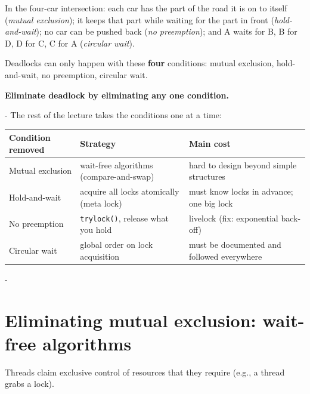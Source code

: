 \documentclass[11pt,a4paper]{article}
\makeatletter
\newcommand{\keepspace}[1]{\par\penalty-100\begingroup
  \setlength{\dimen@}{#1}\dimen@ii\pagegoal\advance\dimen@ii-\pagetotal
  \ifdim\dimen@>\dimen@ii\ifdim\dimen@ii>\z@\vfil\fi\break\fi\endgroup}
\makeatother
\begin{document}
In the four-car intersection: each car has the part of the road it is on to
itself (\emph{mutual exclusion}); it keeps that part while waiting for the
part in front (\emph{hold-and-wait}); no car can be pushed back
(\emph{no preemption}); and A waits for B, B for D, D for C, C for A
(\emph{circular wait}).

\begin{keybox}
Deadlocks can only happen with these \textbf{four} conditions: mutual
exclusion, hold-and-wait, no preemption, circular wait.

\textbf{Eliminate deadlock by eliminating any one condition.}
\end{keybox}

\keepspace{10\baselineskip}
The rest of the lecture takes the conditions one at a time:

\begin{center}
\renewcommand{\arraystretch}{1.2}
\begin{tabularx}{\textwidth}{@{}llX@{}}
  \toprule
  \textbf{Condition removed} & \textbf{Strategy} & \textbf{Main cost} \\
  \midrule
  Mutual exclusion & wait-free algorithms (compare-and-swap) & hard to design beyond simple structures \\
  Hold-and-wait & acquire all locks atomically (meta lock) & must know locks in advance; one big lock \\
  No preemption & \texttt{trylock()}, release what you hold & livelock (fix: exponential back-off) \\
  Circular wait & global order on lock acquisition & must be documented and followed everywhere \\
  \bottomrule
\end{tabularx}
\end{center}

\keepspace{12\baselineskip}
\section{Eliminating mutual exclusion: wait-free algorithms}

\begin{defbox}
Threads claim exclusive control of resources that they require (e.g., a
thread grabs a lock).
\end{defbox}
\end{document}

